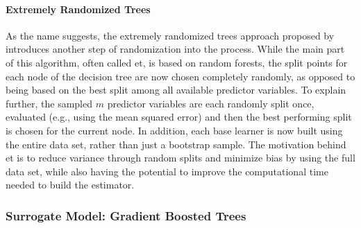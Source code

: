 \paragraph{Extremely Randomized Trees}
As the name suggests, the extremely randomized trees approach proposed by \citet{geurts2006extremely} introduces another step of randomization into the process. While the main part of this algorithm, often called \gls{et}, is based on random forests, the split points for each node of the decision tree are now chosen completely randomly, as opposed to being based on the best split among all available predictor variables. To explain further, the sampled $m$ predictor variables are each randomly split once, evaluated (e.g., using the mean squared error) and then the best performing split is chosen for the current node. In addition, each base learner is now built using the entire data set, rather than just a bootstrap sample. The motivation behind \gls{et} is to reduce variance through random splits and minimize bias by using the full data set, while also having the potential to improve the computational time needed to build the estimator.

\subsubsection{Surrogate Model: Gradient Boosted Trees}

